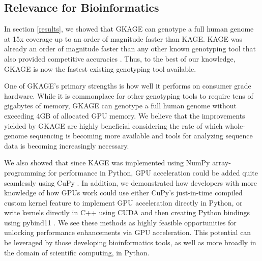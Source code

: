 \subsection{Relevance for Bioinformatics} \label{discussion:relevance_for_bioinformatics}
In section \ref{results}, we showed that GKAGE can genotype a full human genome at 15x coverage up to an order of magnitude faster than KAGE.
KAGE was already an order of magnitude faster than any other known genotyping tool that also provided competitive accuracies \cite{kage}.
Thus, to the best of our knowledge, GKAGE is now the fastest existing genotyping tool available.

One of GKAGE's primary strengths is how well it performs on consumer grade hardware.
While it is commonplace for other genotyping tools to require tens of gigabytes of memory, GKAGE can genotype a full human genome without exceeding 4GB of allocated GPU memory.
We believe that the improvements yielded by GKAGE are highly beneficial considering the rate of which whole-genome sequencing is becoming more available and tools for analyzing sequence data is becoming increasingly necessary.

We also showed that since KAGE was implemented using NumPy \cite{numpy} array-programming for performance in Python, GPU acceleration could be added quite seamlessly using CuPy \cite{cupy}.
In addition, we demonstrated how developers with more knowledge of how GPUs work could use either CuPy's just-in-time compiled custom kernel feature to implement GPU acceleration directly in Python, or write kernels directly in C++ using CUDA \cite{cuda} and then creating Python bindings using pybind11 \cite{pybind11}.
We see these methods as highly feasible opportunities for unlocking performance enhancements via GPU acceleration. 
This potential can be leveraged by those developing bioinformatics tools, as well as more broadly in the domain of scientific computing, in Python.
